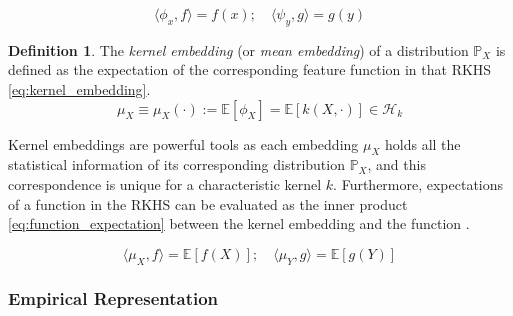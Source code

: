 \documentclass[twoside]{article} \usepackage{aistats2017}
\theoremstyle{definition}
\newtheorem{definition}{Definition}[section]
\theoremstyle{theorem}
\newcommand{\rv}[1]{{#1}}
\newcommand{\extra}[1]{{\color{ForestGreen} #1}}
\newcommand{\expect}[1]{{\mathbb{E}[#1]}}
\newcommand{\inner}[2]{{\langle #1, #2 \rangle}}
\newcommand{\Hk}{\mathcal{H}_{k}}
\newcommand{\muX}{\mu_{\rv{X}}}
\newcommand{\muY}{\mu_{\rv{Y}}}
\newcommand{\phiX}{\phi_{\rv{X}}}
\begin{document}
		\begin{equation}
			\inner{\phi_{x}}{f} = f(x) ;\quad \inner{\psi_{y}}{g} = g(y)
		\label{eq:reproducing_property}
		\end{equation}
		
%
		
		\begin{definition} \label{def:kernel_embedding}
			\citep{smola2007hilbert}
			The \textit{kernel embedding} (or \textit{mean embedding}) of a distribution $\mathbb{P}_{\rv{X}}$ is defined as the expectation of the corresponding feature function in that RKHS \eqref{eq:kernel_embedding}.
			\begin{equation}
				\muX \equiv \muX(\cdot) := \expect{\phiX} = \expect{k(\rv{X}, \cdot)} \in \Hk
			\label{eq:kernel_embedding}
			\end{equation}
		\end{definition}
		
		Kernel embeddings are powerful tools as each embedding $\muX$ holds all the statistical information of its corresponding distribution $\mathbb{P}_{\rv{X}}$, and this correspondence is unique for a characteristic kernel $k$. Furthermore, expectations of a function in the RKHS can be evaluated as the inner product \eqref{eq:function_expectation} between the kernel embedding and the function \citep{muandet2016kernel}.
		
		\begin{equation}
			\inner{\muX}{f} = \expect{f(\rv{X})} ;\quad \inner{\muY}{g} = \expect{g(\rv{Y})}
		\label{eq:function_expectation}
		\end{equation}

		
		\subsubsection{Empirical Representation}
		\label{sec:background:kernel_embeddings:empirical_representation}
			
\end{document}
